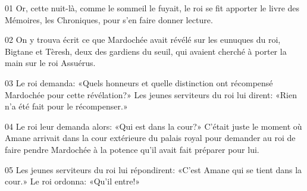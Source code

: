 01 Or, cette nuit-là, comme le sommeil le fuyait, le roi se fit apporter le livre des Mémoires, les Chroniques, pour s’en faire donner lecture.

02 On y trouva écrit ce que Mardochée avait révélé sur les eunuques du roi, Bigtane et Tèresh, deux des gardiens du seuil, qui avaient cherché à porter la main sur le roi Assuérus.

03 Le roi demanda: «Quels honneurs et quelle distinction ont récompensé Mardochée pour cette révélation?» Les jeunes serviteurs du roi lui dirent: «Rien n’a été fait pour le récompenser.»

04 Le roi leur demanda alors: «Qui est dans la cour?» C’était juste le moment où Amane arrivait dans la cour extérieure du palais royal pour demander au roi de faire pendre Mardochée à la potence qu’il avait fait préparer pour lui.

05 Les jeunes serviteurs du roi lui répondirent: «C’est Amane qui se tient dans la cour.» Le roi ordonna: «Qu’il entre!»
